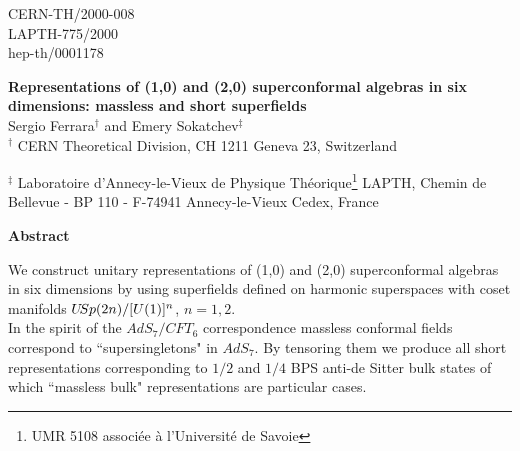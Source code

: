 \documentclass[a4paper,12pt]{article}
\begin{document}
\begin{titlepage}

\begin{flushright}

CERN-TH/2000-008\\ LAPTH-775/2000 \\ hep-th/0001178 

\end{flushright}

\vspace{.5cm} 

\begin{center}

{\Large\bf Representations of (1,0) and (2,0) superconformal 
algebras in six dimensions: massless and short superfields}\\ 
\vfill {\large  Sergio Ferrara$^\dagger$ and Emery 
Sokatchev$^\ddagger$ }\\ \vfill  \vspace{6pt} $^\dagger$ CERN 
Theoretical Division, CH 1211 Geneva 23, Switzerland 
\\ \vspace{6pt}

$^\ddagger$ Laboratoire d'Annecy-le-Vieux de Physique 
Th\'{e}orique\footnote[1]{UMR 5108 associ{\'e}e {\`a} 
 l'Universit{\'e} de Savoie} LAPTH, Chemin
de Bellevue - BP 110 - F-74941 Annecy-le-Vieux Cedex, France 



\end{center}

\vfill 



\begin{center}

{\bf Abstract} 

\end{center}
{\small We construct unitary representations  of (1,0) and (2,0) 
superconformal algebras in six dimensions by using superfields 
defined on harmonic superspaces with coset manifolds $U\hskip-2pt 
Sp(2n)/[U(1)]^n$, $n=1,2$.\\ In the spirit of the $AdS_7/CFT_6$ 
correspondence massless conformal fields correspond to 
``supersingletons" in $AdS_7$. By tensoring them we produce all 
short representations corresponding to $1/2$ and $1/4$ BPS anti-de 
Sitter bulk states of which ``massless bulk" representations are 
particular cases.} 


\end{titlepage}
\end{document}
